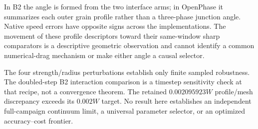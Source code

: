 \documentclass[a4paper,11pt]{article}
\begin{document}
In B2 the angle is formed from the two interface arms; in OpenPhase it summarizes each outer grain profile rather than a three-phase junction angle. Native speed errors have opposite signs across the implementations. The movement of these profile descriptors toward their same-window sharp comparators is a descriptive geometric observation and cannot identify a common numerical-drag mechanism or make either angle a causal selector.

The four strength/radius perturbations establish only finite sampled robustness. The doubled-step B2 interaction comparison is a timestep sensitivity check at that recipe, not a convergence theorem. The retained $0.002095923W$ profile/mesh discrepancy exceeds its $0.002W$ target. No result here establishes an independent full-campaign continuum limit, a universal parameter selector, or an optimized accuracy--cost frontier.



\end{document}
